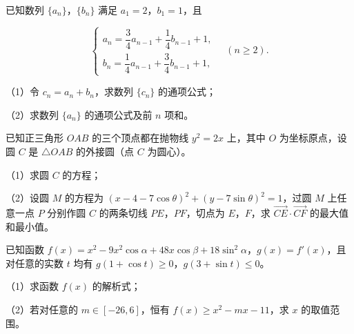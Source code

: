 \begin{question}
已知数列 $\{a_n\}$，$\{b_n\}$ 满足 $a_1=2$，$b_1=1$，且

\nopagebreak[4]
\[\begin{cases}a_n=\dfrac34a_{n-1}+\dfrac14b_{n-1}+1,\\ b_n=\dfrac14a_{n-1}+\dfrac34b_{n-1}+1,\end{cases}\quad(n\geqslant2).\]

（1）令 $c_n=a_n+b_n$，求数列 $\{c_n\}$ 的通项公式；

（2）求数列 $\{a_n\}$ 的通项公式及前 $n$ 项和。

\end{question}
\begin{question}
已知正三角形 $OAB$ 的三个顶点都在抛物线 $y^2=2x$ 上，其中 $O$ 为坐标原点，设圆 $C$ 是 $\triangle OAB$ 的外接圆（点 $C$ 为圆心）。

（1）求圆 $C$ 的方程；

（2）设圆 $M$ 的方程为 $(x-4-7\cos\theta)^2+(y-7\sin\theta)^2=1$，过圆 $M$ 上任意一点 $P$ 分别作圆 $C$ 的两条切线 $PE$，$PF$，切点为 $E$，$F$，求 $\overrightarrow{CE}\cdot\overrightarrow{CF}$ 的最大值和最小值。

\end{question}
\begin{question}
已知函数 $f(x)=x^2-9x^2\cos\alpha+48x\cos\beta+18\sin^2\alpha$，$g(x)=f'(x)$，且对任意的实数 $t$ 均有 $g(1+\cos t)\geqslant0$，$g(3+\sin t)\leqslant0$。

（1）求函数 $f(x)$ 的解析式；

（2）若对任意的 $m\in[-26,6]$，恒有 $f(x)\geqslant x^2-mx-11$，求 $x$ 的取值范围。

\end{question}